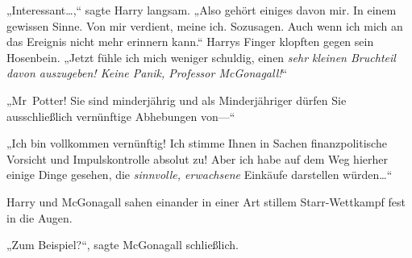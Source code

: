 „Interessant…,“ sagte Harry langsam. „Also gehört einiges davon mir. In einem gewissen Sinne. Von mir verdient, meine ich. Sozusagen. Auch wenn ich mich an das Ereignis nicht mehr erinnern kann.“ Harrys Finger klopften gegen sein Hosenbein. „Jetzt fühle ich mich weniger schuldig, einen \emph{sehr kleinen Bruchteil davon auszugeben! Keine Panik, Professor McGonagall!}“

„Mr~Potter! Sie sind minderjährig und als Minderjähriger dürfen Sie ausschließlich vernünftige Abhebungen von—“

„Ich bin vollkommen vernünftig! Ich stimme Ihnen in Sachen finanzpolitische Vorsicht und Impulskontrolle absolut zu! Aber ich habe auf dem Weg hierher einige Dinge gesehen, die \emph{sinnvolle, erwachsene} Einkäufe darstellen würden…“

Harry und McGonagall sahen einander in einer Art stillem Starr-Wettkampf fest in die Augen.

„Zum Beispiel?“, sagte McGonagall schließlich.

